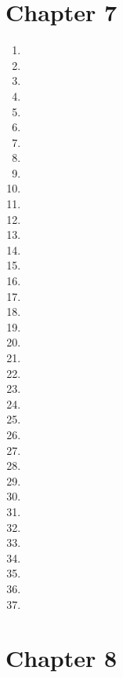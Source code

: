 \documentclass{article}
\begin{document}
\section*{Chapter 7}

\begin{enumerate}
    \item 
    \item 
    \item 
    \item 
    \item 
    \item 
    \item 
    \item 
    \item 
    \item 
    \item 
    \item 
    \item 
    \item 
    \item 
    \item 
    \item 
    \item 
    \item 
    \item 
    \item 
    \item 
    \item 
    \item 
    \item 
    \item 
    \item 
    \item 
    \item 
    \item 
    \item 
    \item 
    \item 
    \item 
    \item 
    \item 
    \item 
\end{enumerate}

\section*{Chapter 8}
\end{document}
